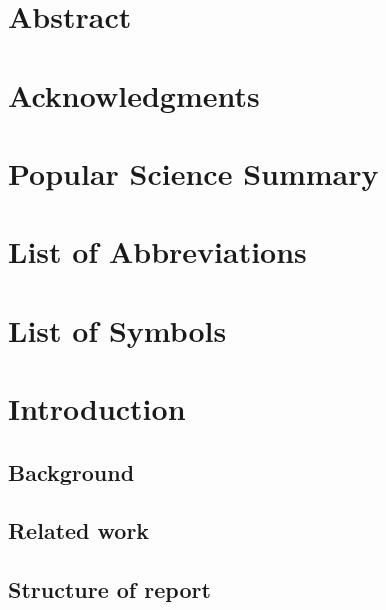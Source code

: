 \documentclass[10pt,a4paper]{eitExjobb}
\begin{document}
	
	
	\MakeTitlePage  %
	
	\frontmatter    %
	
	\chapter*{Abstract}
	
	\chapter*{Acknowledgments}
	
	\chapter*{Popular Science Summary}
	\tableofcontents
	\listoffigures
	\listoftables
	\chapter*{List of Abbreviations}
	\chapter*{List of Symbols}
	\cleardoublepage
	
	\mainmatter		%
	
	\chapter{Introduction}
	
	\section{Background}
	
	\section{Related work}
	
	\section{Structure of report}
	
\end{document}
